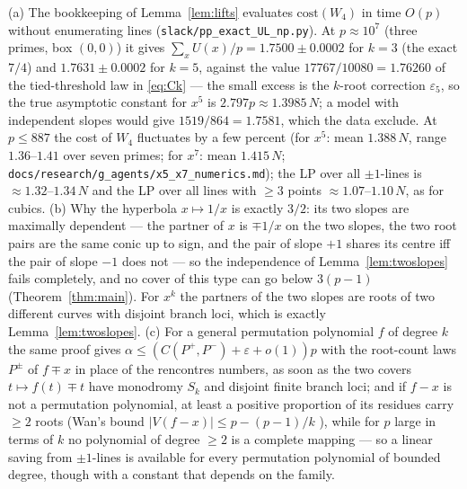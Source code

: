 \begin{remark}
(a) The bookkeeping of Lemma~\ref{lem:lifts} evaluates $\mathrm{cost}(W_4)$ in time $O(p)$ without enumerating lines
(\texttt{slack/pp\_exact\_UL\_np.py}).  At $p\approx10^7$ (three primes, box $(0,0)$) it gives $\sum_xU(x)/p=1.7500\pm0.0002$ for $k=3$ (the exact $7/4$) and
$1.7631\pm0.0002$ for $k=5$, against the value $17767/10080=1.76260$ of the tied-threshold law in \eqref{eq:Ck} — the small excess is the $k$-root
correction $\varepsilon_5$, so the true asymptotic constant for $x^5$ is $2.797p\approx1.3985\,N$; a model with independent slopes would give
$1519/864=1.7581$, which the data exclude.  At $p\le887$ the cost of $W_4$ fluctuates by a few percent (for $x^5$: mean $1.388\,N$, range $1.36$--$1.41$
over seven primes; for $x^7$: mean $1.415\,N$; \texttt{docs/research/g\_agents/x5\_x7\_numerics.md}); the LP over all $\pm1$-lines is $\approx1.32$--$1.34\,N$
and the LP over all lines with $\ge3$ points $\approx1.07$--$1.10\,N$, as for cubics.
(b) Why the hyperbola $x\mapsto1/x$ is exactly $3/2$: its two slopes are maximally dependent — the partner of $x$ is $\mp1/x$ on the two slopes, the two
root pairs are the same conic up to sign, and the pair of slope $+1$ shares its centre iff the pair of slope $-1$ does not — so the independence of
Lemma~\ref{lem:twoslopes} fails completely, and no cover of this type can go below $3(p-1)$ (Theorem~\ref{thm:main}).  For $x^k$ the partners of the two
slopes are roots of two different curves with disjoint branch loci, which is exactly Lemma~\ref{lem:twoslopes}.
(c) For a general permutation polynomial $f$ of degree $k$ the same proof gives $\alpha\le(C(P^+,P^-)+\varepsilon+o(1))p$ with the root-count laws
$P^\pm$ of $f\mp x$ in place of the rencontres numbers, as soon as the two covers $t\mapsto f(t)\mp t$ have monodromy $S_k$ and disjoint finite branch
loci; and if $f-x$ is not a permutation polynomial, at least a positive proportion of its residues carry $\ge2$ roots (Wan's bound $|V(f-x)|\le p-(p-1)/k$
\cite{Wan93}), while for $p$ large in terms of $k$ no polynomial of degree $\ge2$ is a complete mapping \cite{NR82} — so a linear saving from
$\pm1$-lines is available for every permutation polynomial of bounded degree, though with a constant that depends on the family.
\end{remark}
